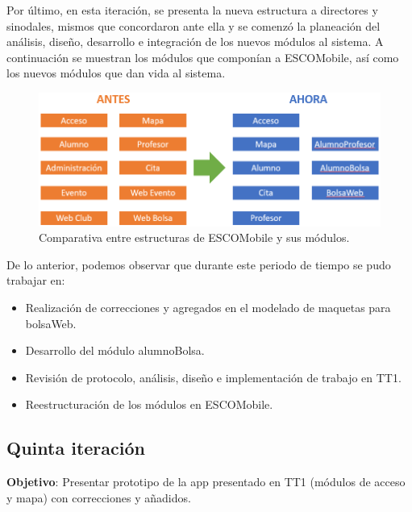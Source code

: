 \newline
Por último, en esta iteración, se presenta la nueva estructura a directores y sinodales, mismos que concordaron ante ella y se comenzó la planeación del análisis, diseño, desarrollo e integración de los nuevos módulos al sistema.
\newline
A continuación se muestran los módulos que componían a ESCOMobile, así como los nuevos módulos que dan vida al sistema. 
\begin{figure}[!htpb]
	\hypertarget{fig:reestructuracion}{\hspace{1pt}}
	\begin{center}
		\includegraphics[width=1\textwidth]{images/reporte/reestructuracion.png}
		\caption{Comparativa entre estructuras de ESCOMobile y sus módulos.}
		\label{fig:reestructuracion}
	\end{center}
\end{figure}

\noindent
De lo anterior, podemos observar que durante este periodo de tiempo se pudo trabajar en:
\begin{itemize}
	\item Realización de correcciones y agregados en el modelado de maquetas para bolsaWeb.
	\item Desarrollo del módulo alumnoBolsa.
	\item Revisión de protocolo, análisis, diseño e implementación de trabajo en TT1.
	\item Reestructuración de los módulos en ESCOMobile.
\end{itemize}


\subsection{Quinta iteración} 

\noindent
\textbf{Objetivo}: Presentar prototipo de la app presentado en TT1 (módulos de acceso y mapa) con correcciones y añadidos. 
\newline


